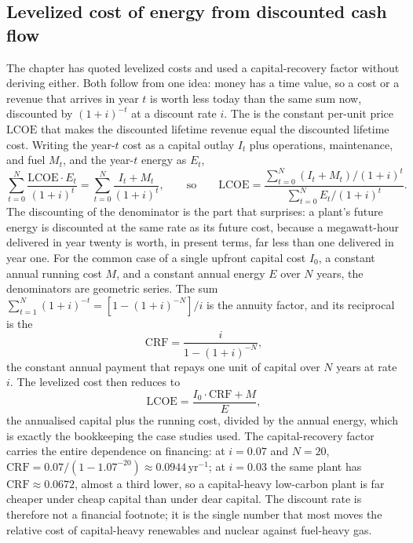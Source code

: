 \subsection{Levelized cost of energy from discounted cash flow}

The chapter has quoted levelized costs and used a capital-recovery factor
without deriving either. Both follow from one idea: money has a time value,
so a cost or a revenue that arrives in year $t$ is worth less today than the
same sum now, discounted by $(1+i)^{-t}$ at a discount rate $i$. The
 is the constant per-unit price $\text{LCOE}$
that makes the discounted lifetime revenue equal the discounted lifetime cost.
Writing the year-$t$ cost as a capital outlay $I_t$ plus operations,
maintenance, and fuel $M_t$, and the year-$t$ energy as $E_t$,
\[
\sum_{t=0}^{N} \frac{\text{LCOE}\cdot E_t}{(1+i)^t}
= \sum_{t=0}^{N} \frac{I_t + M_t}{(1+i)^t},
\qquad\text{so}\qquad
\text{LCOE} = \frac{\displaystyle\sum_{t=0}^{N} (I_t + M_t)/(1+i)^t}
{\displaystyle\sum_{t=0}^{N} E_t/(1+i)^t}.
\]
The discounting of the denominator is the part that surprises: a plant's
future energy is discounted at the same rate as its future cost, because a
megawatt-hour delivered in year twenty is worth, in present terms, far less
than one delivered in year one. For the common case of a single upfront
capital cost $I_0$, a constant annual running cost $M$, and a constant annual
energy $E$ over $N$ years, the denominators are geometric series. The sum
$\sum_{t=1}^{N}(1+i)^{-t} = [1 - (1+i)^{-N}]/i$ is the annuity factor, and its
reciprocal is the 
\[
\text{CRF} = \frac{i}{1 - (1+i)^{-N}},
\]
the constant annual payment that repays one unit of capital over $N$ years at
rate $i$. The levelized cost then reduces to
\[
\text{LCOE} = \frac{I_0 \cdot \text{CRF} + M}{E},
\]
the annualised capital plus the running cost, divided by the annual energy,
which is exactly the bookkeeping the case studies used. The capital-recovery
factor carries the entire dependence on financing: at $i = 0.07$ and $N = 20$,
$\text{CRF} = 0.07/(1 - 1.07^{-20}) \approx 0.0944\,\text{yr}^{-1}$; at $i =
0.03$ the same plant has $\text{CRF} \approx 0.0672$, almost a third lower, so
a capital-heavy low-carbon plant is far cheaper under cheap capital than under
dear capital. The discount rate is therefore not a financial footnote; it is
the single number that most moves the relative cost of capital-heavy
renewables and nuclear against fuel-heavy gas.

